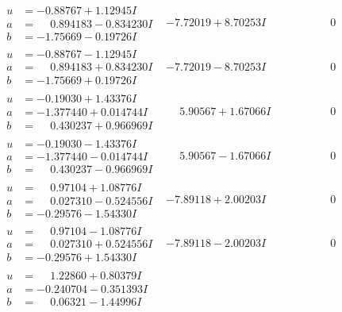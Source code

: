 \documentclass[1p]{elsarticle_modified}
\theoremstyle{definition}
\begin{document}
$$\begin{array}{c|c|c}
 \hline 
\begin{aligned}
u &= -0.88767 + 1.12945 I \\
a &= \phantom{-}0.894183 - 0.834230 I \\
b &= -1.75669 - 0.19726 I\end{aligned}
 & -7.72019 + 8.70253 I & \phantom{-0.000000 } 0 \\ \hline\begin{aligned}
u &= -0.88767 - 1.12945 I \\
a &= \phantom{-}0.894183 + 0.834230 I \\
b &= -1.75669 + 0.19726 I\end{aligned}
 & -7.72019 - 8.70253 I & \phantom{-0.000000 } 0 \\ \hline\begin{aligned}
u &= -0.19030 + 1.43376 I \\
a &= -1.377440 + 0.014744 I \\
b &= \phantom{-}0.430237 + 0.966969 I\end{aligned}
 & \phantom{-}5.90567 + 1.67066 I & \phantom{-0.000000 } 0 \\ \hline\begin{aligned}
u &= -0.19030 - 1.43376 I \\
a &= -1.377440 - 0.014744 I \\
b &= \phantom{-}0.430237 - 0.966969 I\end{aligned}
 & \phantom{-}5.90567 - 1.67066 I & \phantom{-0.000000 } 0 \\ \hline\begin{aligned}
u &= \phantom{-}0.97104 + 1.08776 I \\
a &= \phantom{-}0.027310 - 0.524556 I \\
b &= -0.29576 - 1.54330 I\end{aligned}
 & -7.89118 + 2.00203 I & \phantom{-0.000000 } 0 \\ \hline\begin{aligned}
u &= \phantom{-}0.97104 - 1.08776 I \\
a &= \phantom{-}0.027310 + 0.524556 I \\
b &= -0.29576 + 1.54330 I\end{aligned}
 & -7.89118 - 2.00203 I & \phantom{-0.000000 } 0 \\ \hline\begin{aligned}
u &= \phantom{-}1.22860 + 0.80379 I \\
a &= -0.240704 - 0.351393 I \\
b &= \phantom{-}0.06321 - 1.44996 I\end{aligned}

\end{array}$$
\end{document}
